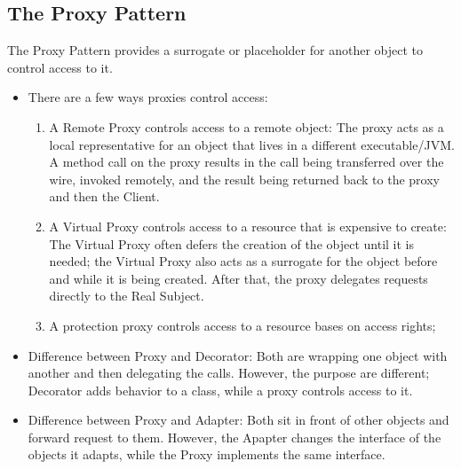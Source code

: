 \documentclass[11pt]{article}
\begin{document}
    \subsection{The Proxy Pattern}
    The Proxy Pattern provides a surrogate or placeholder for another object to control access to it.
    \begin{itemize}
        \item There are a few ways proxies control access:
        \begin{enumerate}
            \item A Remote Proxy controls access to a remote object: The proxy acts as a local representative for an object
            that lives in a different executable/JVM. A method call on the proxy results in the call being transferred over the wire,
            invoked remotely, and the result being returned back to the proxy and then the Client.
            \item A Virtual Proxy controls access to a resource that is expensive to create: The Virtual Proxy often defers
            the creation of the object until it is needed; the Virtual Proxy also acts as a surrogate for the object before and while
            it is being created. After that, the proxy delegates requests directly to the Real Subject.
            \item A protection proxy controls access to a resource bases on access rights;
        \end{enumerate}
        \item Difference between Proxy and Decorator: Both are wrapping one object with another and then delegating the calls.
        However, the purpose are different; Decorator adds behavior to a class, while a proxy controls access to it.
        \item  Difference between Proxy and Adapter: Both sit in front of other objects and forward request to them. However,
        the Apapter changes the interface of the objects it adapts, while the Proxy implements the same interface.
    \end{itemize}
\end{document}
